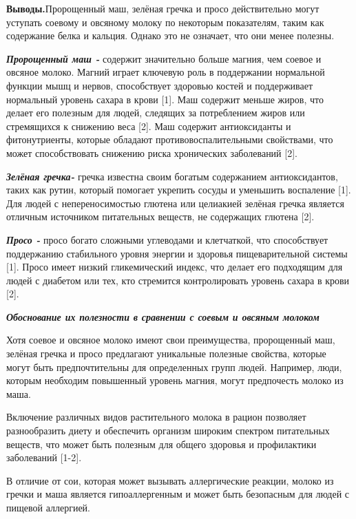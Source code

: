 \begin{multicols}{2}
{\bfseries Выводы.}Пророщенный маш, зелёная гречка и просо действительно
могут уступать соевому и овсяному молоку по некоторым показателям, таким
как содержание белка и кальция. Однако это не означает, что они менее
полезны.

\emph{{\bfseries Пророщенный маш -}} содержит значительно больше магния,
чем соевое и овсяное молоко. Магний играет ключевую роль в поддержании
нормальной функции мышц и нервов, способствует здоровью костей и
поддерживает нормальный уровень сахара в крови\hspace{0pt} {[}1{]}. Маш
содержит меньше жиров, что делает его полезным для людей, следящих за
потреблением жиров или стремящихся к снижению веса {[}2{]}. Маш содержит
антиоксиданты и фитонутриенты, которые обладают противовоспалительными
свойствами, что может способствовать снижению риска хронических
заболеваний {[}2{]}.

\emph{{\bfseries Зелёная гречка-}} гречка известна своим богатым
содержанием антиоксидантов, таких как рутин, который помогает укрепить
сосуды и уменьшить воспаление {[}1{]}. Для людей с непереносимостью
глютена или целиакией зелёная гречка является отличным источником
питательных веществ, не содержащих глютена {[}2{]}.

\emph{{\bfseries Просо -}} просо богато сложными углеводами и клетчаткой,
что способствует поддержанию стабильного уровня энергии и здоровья
пищеварительной системы {[}1{]}. Просо имеет низкий гликемический
индекс, что делает его подходящим для людей с диабетом или тех, кто
стремится контролировать уровень сахара в крови {[}2{]}.

\emph{{\bfseries Обоснование их полезности в сравнении с соевым и овсяным
молоком}}

Хотя соевое и овсяное молоко имеют свои преимущества, пророщенный маш,
зелёная гречка и просо предлагают уникальные полезные свойства, которые
могут быть предпочтительны для определенных групп людей. Например, люди,
которым необходим повышенный уровень магния, могут предпочесть молоко из
маша.

Включение различных видов растительного молока в рацион позволяет
разнообразить диету и обеспечить организм широким спектром питательных
веществ, что может быть полезным для общего здоровья и профилактики
заболеваний {[}1-2{]}.

В отличие от сои, которая может вызывать аллергические реакции, молоко
из гречки и маша является гипоаллергенным и может быть безопасным для
людей с пищевой аллергией.


\end{multicols}

